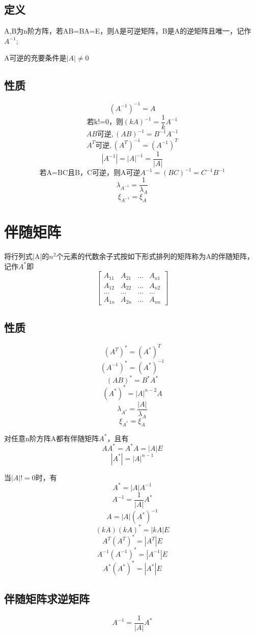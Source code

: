 \subsection{定义}
A,B为n阶方阵，若AB=BA=E，则A是可逆矩阵，B是A的逆矩阵且唯一，记作\(A^{-1}\);

A可逆的充要条件是\(|A|\neq 0\)
\mymatrix


\subsection{性质}
\[(A^{-1})^{-1} = A\]
\[\text{若k!=0，则}(kA)^{-1} = \frac{1}{k}A^{-1}\]
\[AB\text{可逆},(AB)^{-1} = B^{-1}A^{-1}\]
\[A^T\text{可逆},(A^T)^{-1} = (A^{-1})^T\]
\[|A^{-1}| = |A|^{-1} = \frac{1}{|A|}\]
\[\text{若A=BC且B，C可逆，则A可逆}A^{-1} = (BC)^{-1} = C^{-1}B^{-1}\]
\[\lambda_{A^{-1}} = \dfrac{1}{\lambda_A}\]
\[\xi_{A^{-1}} = \xi_A\]


\section{伴随矩阵}

将行列式|A|的\(n^2\)个元素的代数余子式按如下形式排列的矩阵称为A的伴随矩阵，记作\(A^*\)即
\[
\begin{bmatrix}
A_{11} & A_{21} & ... & A_{n1} \\ 
A_{12} & A_{22} & ... & A_{n2} \\ 
... & ... & ... & ... \\ 
A_{1n} & A_{2n} & ... & A_{nn}
\end{bmatrix}
\]


\subsection{性质}

\[(A^T)^* = (A^*)^T\]
\[(A^{-1})^* = (A^*)^{-1}\]
\[(AB)^* = B^*A^*\]
\[(A^*)^* = |A|^{n - 2}A\]
\[\lambda_{A^*} = \dfrac{|A|}{\lambda_A}\]
\[\xi_{A^*} = \xi_A\]

对任意n阶方阵A都有伴随矩阵\(A^*\)，且有
\[AA^* = A^*A = |A|E\]
\[|A^*| = |A|^{n-1}\]

当\(|A|!= 0\)时，有
\[A^* = |A|A^{-1}\]
\[A^{-1} = \frac{1}{|A|}A^*\]
\[A = |A|(A^*)^{-1}\]
\[(kA)(kA)^* = |kA|E\]
\[A^T(A^T)^* = |A^T|E\]
\[A^{-1}(A^{-1})^* = |A^{-1}|E\]
\[A^*(A^*)^* = |A^*|E\]



\subsection{伴随矩阵求逆矩阵}
\[A^{-1} = \frac{1}{|A|}A^*\]


